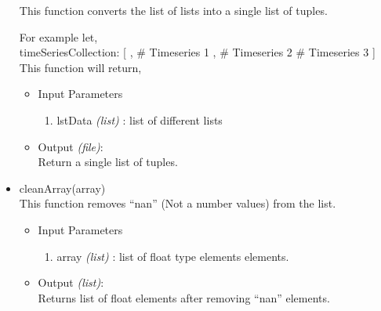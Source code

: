 \begin{itemize}
  This function converts the list of lists into a single list of tuples. 
  
  For example let,\\
	timeSeriesCollection: [ \newline
	    [1,2,3], \# Timeseries 1 \newline
	    [4,5,6], \# Timeseries 2 \newline
	    [7,8,9] \# Timeseries 3 \newline
	] \newline
	\\
	This function will return, \newline
  
 \begin{itemize}
	  \item Input Parameters
	  
	  \begin{enumerate}
	    \item lstData \textit{(list)} : list of different lists
	    \end{enumerate}

	  \item Output \textit{(file)}: \\
	  Return a single list of tuples.
	  
	\end{itemize}
	
 \item cleanArray(array) \\
 
	This function removes ``nan'' (Not a number values) from the list.
	
	\begin{itemize}
	  \item Input Parameters
	  
	  \begin{enumerate}
	    \item array \textit{(list)} : list of float type elements
elements.
	  \end{enumerate}

	  \item Output \textit{(list)}: \\
	  Returns list of float elements after removing ``nan'' elements.
	  

\end{itemize}
\end{itemize}
